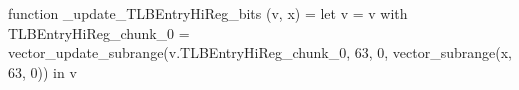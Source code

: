 function _update_TLBEntryHiReg_bits (v, x) = let v = { v with TLBEntryHiReg_chunk_0 = vector_update_subrange(v.TLBEntryHiReg_chunk_0, 63, 0, vector_subrange(x, 63, 0)) } in v
